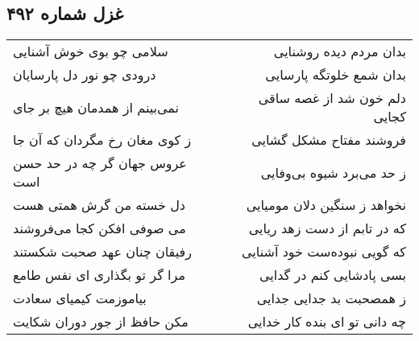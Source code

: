 \begin{center}
\section*{غزل شماره ۴۹۲}
\label{sec:sh492}
\begin{longtable}{l p{0.5cm} r}
سلامی چو بوی خوش آشنایی
&&
بدان مردم دیده روشنایی
\\
درودی چو نور دل پارسایان
&&
بدان شمع خلوتگه پارسایی
\\
نمی‌بینم از همدمان هیچ بر جای
&&
دلم خون شد از غصه ساقی کجایی
\\
ز کوی مغان رخ مگردان که آن جا
&&
فروشند مفتاح مشکل گشایی
\\
عروس جهان گر چه در حد حسن است
&&
ز حد می‌برد شیوه بی‌وفایی
\\
دل خسته من گرش همتی هست
&&
نخواهد ز سنگین دلان مومیایی
\\
می صوفی افکن کجا می‌فروشند
&&
که در تابم از دست زهد ریایی
\\
رفیقان چنان عهد صحبت شکستند
&&
که گویی نبوده‌ست خود آشنایی
\\
مرا گر تو بگذاری ای نفس طامع
&&
بسی پادشایی کنم در گدایی
\\
بیاموزمت کیمیای سعادت
&&
ز همصحبت بد جدایی جدایی
\\
مکن حافظ از جور دوران شکایت
&&
چه دانی تو ای بنده کار خدایی
\\
\end{longtable}
\end{center}

